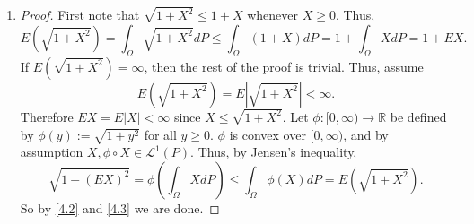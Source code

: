 \documentclass[12pt]{article}
\newenvironment{claimproof}[1]{\par\noindent\underline{Proof of claim:}\space#1}{\hfill $\blacksquare$\vspace{5mm}}
\begin{document}
\begin{enumerate}[label=(\alph*)]
\begin{proof}
\begin{claimproof}
Since $\phi_{2}(X) = -\log X > 0$ when $X < 1$, this implies 
\[ \int_{\{X < 1\}}-\log X = \infty, \qquad \text{ and so }\qquad \int_{\{X < 1\}}\log X = -\infty. \]
Thus, by \eqref{4.1} $E(\log X) = -\infty$. Hence claim 3 holds trivially.

{\bf Subcase 2.2:} $\int_{\{X < 1\}}|\phi_{2}\circ X|dP < \infty$.

Thus, by \eqref{4.1}, $\phi_{2} \circ X \in \mathcal{L}^{1}(P)$. So, since $\phi_{2}$ is convex over $(0,\infty)$,
\[ -\log(EX) = \phi_{2}\left( \int_{\Omega}XdP \right) \leq \int_{\Omega}\phi_{2}\circ XdP = E(-\log X). \]
By multiplying both sides by $-1$, we are done.
\end{claimproof}

Hence, by claims 2 and 3 we are done.
\end{proof}

\vspace{8mm}
\item
\begin{proof}
First note that $\sqrt{1 + X^{2}} \leq 1 + X$ whenever $X \geq 0$. Thus,
\begin{equation}
E(\sqrt{1+X^{2}}) = \int_{\Omega}\sqrt{1 + X^{2}}dP \leq \int_{\Omega}(1 + X)dP = 1 + \int_{\Omega}XdP = 1 + EX.
\label{4.2}
\end{equation}
If $E(\sqrt{1 + X^{2}}) = \infty$, then the rest of the proof is trivial. Thus, assume 
\[ E(\sqrt{1 + X^{2}}) = E|\sqrt{1 + X^{2}}| < \infty.\] 
Therefore $EX = E|X| < \infty$ since $X \leq \sqrt{1 + X^{2}}$.
Let $\phi : [0,\infty) \rightarrow \mathbb{R}$ be defined by $\phi(y) := \sqrt{1 + y^{2}}$ for all $y \geq 0$. $\phi$ is convex over $[0,\infty)$,
and by assumption $X, \phi\circ X \in \mathcal{L}^{1}(P)$. Thus, by Jensen's inequality,
\begin{equation}
\sqrt{1 + (EX)^{2}} = \phi\left( \int_{\Omega}XdP \right) \leq \int_{\Omega}\phi(X) dP = E(\sqrt{1 + X^{2}}).
\label{4.3}
\end{equation}
So by \eqref{4.2} and \eqref{4.3} we are done.
\end{proof}
\end{enumerate}
\end{document}
